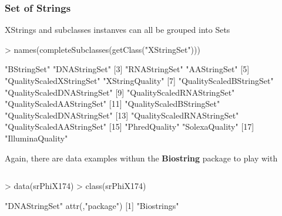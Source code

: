 \documentclass{beamer}
\begin{document}

\begin{frame}[fragile]
\frametitle{Set of Strings}
  \bit
      \item XStrings and subclasses instanves can all be grouped into Sets
        \begin{uncoverenv}
\begin{Schunk}
\begin{Sinput}
> names(completeSubclasses(getClass("XStringSet")))
\end{Sinput}
\begin{Soutput}
 [1] "BStringSet"                "DNAStringSet"             
 [3] "RNAStringSet"              "AAStringSet"              
 [5] "QualityScaledXStringSet"   "XStringQuality"           
 [7] "QualityScaledBStringSet"   "QualityScaledDNAStringSet"
 [9] "QualityScaledRNAStringSet" "QualityScaledAAStringSet" 
[11] "QualityScaledBStringSet"   "QualityScaledDNAStringSet"
[13] "QualityScaledRNAStringSet" "QualityScaledAAStringSet" 
[15] "PhredQuality"              "SolexaQuality"            
[17] "IlluminaQuality"          
\end{Soutput}
\end{Schunk}
        \end{uncoverenv}  
      \item Again, there are data examples withun the \textbf{Biostring} package to play with
          \begin{columns}
            \begin{column}[t]{0.45\textwidth}%
                \begin{uncoverenv}
\begin{Schunk}
\begin{Sinput}
> data(srPhiX174)
> class(srPhiX174)
\end{Sinput}
\begin{Soutput}
[1] "DNAStringSet"
attr(,"package")
[1] "Biostrings"
\end{Soutput}
\end{Schunk}
                \end{uncoverenv}  
            \end{column}
            \begin{column}[t]{0.70\textwidth}%
                \begin{uncoverenv}
\begin{Schunk}
\begin{Sinput}

\end{Sinput}
\end{Schunk}
\end{uncoverenv}
\end{column}
\end{columns}
\end{frame}
\end{document}
